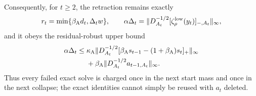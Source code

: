 \begin{lemma}
\begin{align}
\end{align}
Consequently, for $t\geq2$, the retraction remains exactly
\begin{equation}
 r_t=\min\{\beta_{\mathrm A}d_t,\Delta_t w\},
 \qquad
 \alpha\Delta_t
 =\lVert D_{A_t}^{-1/2}
 [\zeta_\rho^{\mathrm{low}}(y_t)]_{-,A_t}\rVert_\infty,
 \label{eq:aesp-cd-finite-inner-retraction}
\end{equation}
and it obeys the residual-robust upper bound
\begin{align}
 \alpha\Delta_t
 \leq{}&\kappa_{\mathrm A}
 \lVert D_{A_t}^{-1/2}
 [\beta_{\mathrm A}s_{t-1}-(1+\beta_{\mathrm A})s_t]_+\rVert_\infty
 \notag\\
 &+\beta_{\mathrm A}
 \lVert D_{A_t}^{-1/2}a_{t-1,A_t}\rVert_\infty.
 \label{eq:aesp-cd-finite-inner-collapse-upper}
\end{align}
Thus every failed exact solve is charged once in the next start mass and once
in the next collapse; the exact identities cannot simply be reused with
$a_t$ deleted.
\end{lemma}

